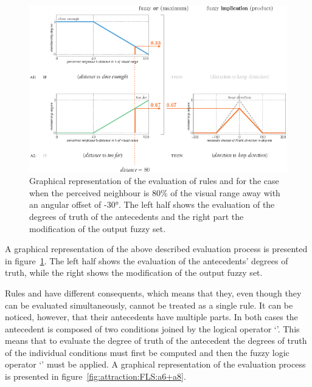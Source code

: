 \begin{figure}%
\includegraphics{fig[attractionFLSa1+a2]}
\caption{Graphical representation of the evaluation of rules  and  for the case when the perceived neighbour is 80\% of the visual range away with an angular offset of \ang{-30}. The left half shows the evaluation of the degrees of truth of the antecedents and the right part the modification of the output fuzzy set.}
\label{fig:attraction:FLS:a1+a2}
\end{figure}

A graphical representation of the above described evaluation process is presented in figure~\ref{fig:attraction:FLS:a1+a2}. The left half shows the evaluation of the antecedents' degrees of truth, while the right shows the modification of the output fuzzy set.

Rules  and  have different consequents, which means that they, even though they can be evaluated simultaneously, cannot be treated as a single rule. It can be noticed, however, that their antecedents have multiple parts. In both cases the antecedent is composed of two conditions joined by the logical operator `'. This means that to evaluate the degree of truth of the antecedent the degrees of truth of the individual conditions must first be computed and then the fuzzy logic operator `' must be applied. A graphical representation of the evaluation process is presented in figure~\ref{fig:attraction:FLS:a6+a8}.

